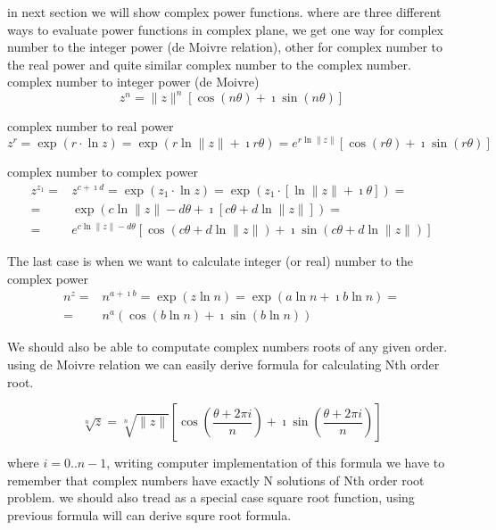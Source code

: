 \documentclass[11pt,a4paper,openany,oneside]{extreport}
\begin{document}
in next section we will show complex power functions. where are three different ways to evaluate power functions in complex plane, we get one way for complex
number to the integer power (de Moivre relation), other for complex number to the real power and quite similar complex number to the complex number.
complex number to integer power (de Moivre)
 \begin{displaymath}
 z^n = \|z\|^n\left[ \cos\left(n\theta\right) + \imath \sin\left(n\theta\right) \right]
 \end{displaymath}

complex number to real power
 \begin{displaymath}
 z^r = \exp{(r\cdot \ln z)}=\exp{(r\ln\|z\| + \imath r\theta)}=e^{r\ln\|z\|}[\cos{(r\theta)}+\imath \sin{(r\theta)}]
 \end{displaymath}

complex number to complex power
 \begin{displaymath}
  \begin{array}{rl}
 z^{z_1} = &z^{c+\imath d}=\exp{(z_1\cdot \ln z)}=\exp{(z_1\cdot[\ln\|z\|+\imath \theta])}=\\
  = & \exp{(c\ln\|z\|-d\theta+\imath[c\theta+d\ln\|z\|])}= \\
  = & e^{c\ln\|z\|-d\theta}[\cos(c\theta+d\ln\|z\|)+\imath \sin(c\theta+d\ln\|z\|)]
  \end{array}
 \end{displaymath}

The last case is when we want to calculate integer (or real) number to the complex power
\begin{displaymath}
 \begin{array}{rl}
 n^z = & n^{a+\imath b} = \exp( z \ln n ) = \exp(a\ln n + \imath b\ln n) = \\
 = & n^a \left( \cos(b \ln n) + \imath \sin(b \ln n) \right )
 \end{array}
\end{displaymath}

We should also be able to computate complex numbers roots of any given order. using de Moivre relation we can 
easily derive formula for calculating Nth order root. 

\begin{displaymath}
	\sqrt[n]{z} = \sqrt[n]{\|z\|}\left[ \cos\left( \frac{\theta+2\pi i}{n} \right) + \imath \sin\left( \frac{\theta+2\pi i}{n} \right) \right]
\end{displaymath}

where $i=0..n-1$, writing computer implementation of this formula we have to remember that complex numbers have exactly N 
solutions of Nth order root problem. we should also tread as a special case square root function, 
using previous formula will can derive squre root formula.
\end{document}
